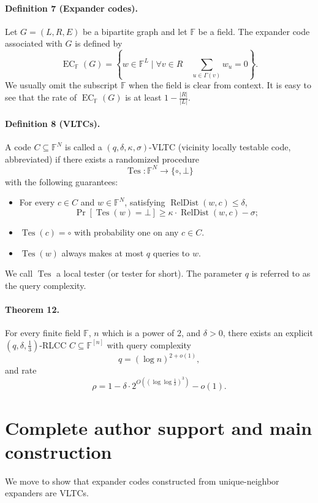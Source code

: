 \documentclass[10pt,a4paper]{article}
\begin{document}
\paragraph{Definition 7 (Expander codes).} Let $G=(L,R,E)$ be a bipartite graph and let $\mathbb F$ be a field. The expander code associated with $G$ is defined by
\[\operatorname{EC}_{\mathbb F}(G)=\left\{w\in\mathbb F^L\mid\forall v\in R\quad\sum_{u\in\Gamma(v)}w_u=0\right\}.\]
We usually omit the subscript $\mathbb F$ when the field is clear from context.
It is easy to see that the rate of $\operatorname{EC}_{\mathbb F}(G)$ is at least $1-\frac{|R|}{|L|}$.
\paragraph{Definition 8 (VLTCs).} A code $C\subseteq\mathbb F^N$ is called a $(q,\delta,\kappa,\sigma)$-VLTC (vicinity locally testable code, abbreviated) if there exists a randomized procedure
\[\operatorname{Tes}:\mathbb F^N\to\{\circ,\bot\}\]
with the following guarantees:
\begin{itemize}
\item For every $c\in C$ and $w\in\mathbb F^N$, satisfying $\operatorname{RelDist}(w,c)\le\delta$,
\[\Pr[\operatorname{Tes}(w)=\bot]\ge\kappa\cdot\operatorname{RelDist}(w,c)-\sigma;\]
\item $\operatorname{Tes}(c)=\circ$ with probability one on any $c\in C$.
\item $\operatorname{Tes}(w)$ always makes at most $q$ queries to $w$.
\end{itemize}
We call $\operatorname{Tes}$ a local tester (or tester for short). The parameter $q$ is referred to as the query complexity.

\paragraph{Theorem 12.} For every finite field $\mathbb F$, $n$ which is a power of 2, and $\delta>0$, there exists an explicit $(q,\delta,\frac13)$-RLCC $C\subseteq\mathbb F^{[n]}$ with query complexity
\[q=(\log n)^{2+o(1)},\]
and rate
\[\rho=1-\delta\cdot2^{O((\log\log\frac1\delta)^3)}-o(1).\]

\section*{Complete author support and main construction}
We move to show that expander codes constructed from unique-neighbor expanders are VLTCs.
\end{document}
